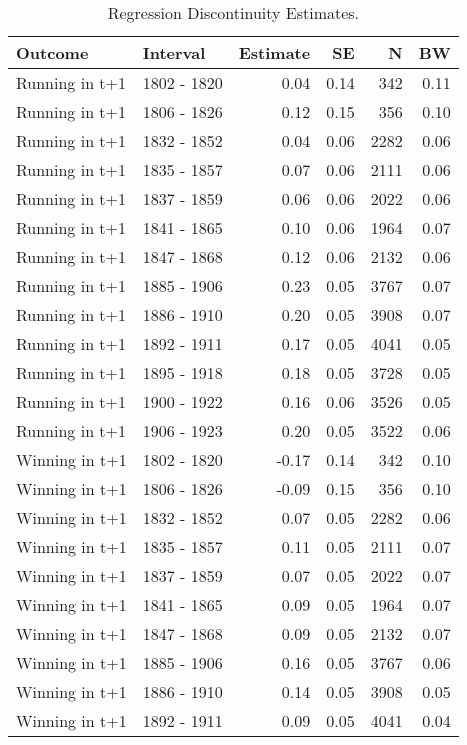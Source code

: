 \begin{table}

\caption{Regression Discontinuity Estimates. \label{tab:rd_est}}
\centering
\begin{threeparttable}
\begin{tabular}[t]{llrrrr}
\toprule
Outcome & Interval & Estimate & SE & N & BW\\
\midrule
Running in t+1 & 1802 - 1820 & 0.04 & 0.14 & 342 & 0.11\\
Running in t+1 & 1806 - 1826 & 0.12 & 0.15 & 356 & 0.10\\
Running in t+1 & 1832 - 1852 & 0.04 & 0.06 & 2282 & 0.06\\
Running in t+1 & 1835 - 1857 & 0.07 & 0.06 & 2111 & 0.06\\
Running in t+1 & 1837 - 1859 & 0.06 & 0.06 & 2022 & 0.06\\
Running in t+1 & 1841 - 1865 & 0.10 & 0.06 & 1964 & 0.07\\
Running in t+1 & 1847 - 1868 & 0.12 & 0.06 & 2132 & 0.06\\
Running in t+1 & 1885 - 1906 & 0.23 & 0.05 & 3767 & 0.07\\
Running in t+1 & 1886 - 1910 & 0.20 & 0.05 & 3908 & 0.07\\
Running in t+1 & 1892 - 1911 & 0.17 & 0.05 & 4041 & 0.05\\
Running in t+1 & 1895 - 1918 & 0.18 & 0.05 & 3728 & 0.05\\
Running in t+1 & 1900 - 1922 & 0.16 & 0.06 & 3526 & 0.05\\
Running in t+1 & 1906 - 1923 & 0.20 & 0.05 & 3522 & 0.06\\
\midrule
Winning in t+1 & 1802 - 1820 & -0.17 & 0.14 & 342 & 0.10\\
Winning in t+1 & 1806 - 1826 & -0.09 & 0.15 & 356 & 0.10\\
Winning in t+1 & 1832 - 1852 & 0.07 & 0.05 & 2282 & 0.06\\
Winning in t+1 & 1835 - 1857 & 0.11 & 0.05 & 2111 & 0.07\\
Winning in t+1 & 1837 - 1859 & 0.07 & 0.05 & 2022 & 0.07\\
Winning in t+1 & 1841 - 1865 & 0.09 & 0.05 & 1964 & 0.07\\
Winning in t+1 & 1847 - 1868 & 0.09 & 0.05 & 2132 & 0.07\\
Winning in t+1 & 1885 - 1906 & 0.16 & 0.05 & 3767 & 0.06\\
Winning in t+1 & 1886 - 1910 & 0.14 & 0.05 & 3908 & 0.05\\
Winning in t+1 & 1892 - 1911 & 0.09 & 0.05 & 4041 & 0.04\\

\end{tabular}
\end{threeparttable}
\end{table}
